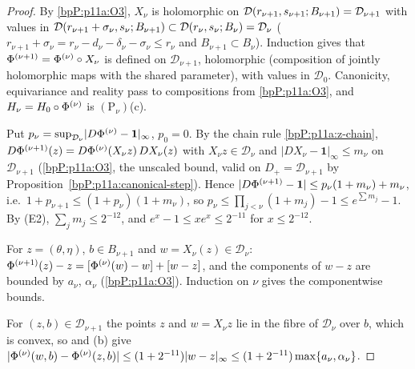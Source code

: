 \begin{proof}
\label{stepP:p11a:co-dom} By \ref{bpP:p11a:O3}, $X_\nu$ is holomorphic on $\mathcal D(r_{\nu+1},s_{\nu+1};B_{\nu+1})=\mathcal D_{\nu+1}$ with values in $\mathcal D(r_{\nu+1}+\sigma_\nu,s_\nu;B_{\nu+1})\subset\mathcal D(r_\nu,s_\nu;B_\nu)=\mathcal D_\nu$ ($r_{\nu+1}+\sigma_\nu=r_\nu-d_\nu-\delta_\nu-\sigma_\nu\le r_\nu$ and $B_{\nu+1}\subset B_\nu$). Induction gives that $\Phi^{(\nu+1)}=\Phi^{(\nu)}\circ X_\nu$ is defined on $\mathcal D_{\nu+1}$, holomorphic (composition of jointly holomorphic maps with the shared parameter), with values in $\mathcal D_0$. Canonicity, equivariance and reality pass to compositions from \ref{bpP:p11a:O3}, and $H_\nu=H_0\circ\Phi^{(\nu)}$ is $(\mathrm P_\nu)$(c).

\label{stepP:p11a:co-deriv} Put $p_\nu=\sup_{\mathcal D_\nu}\lvert D\Phi^{(\nu)}-\mathbf 1\rvert_\infty$, $p_0=0$. By the chain rule \ref{bpP:p11a:z-chain}, $D\Phi^{(\nu+1)}(z)=D\Phi^{(\nu)}(X_\nu z)\,DX_\nu(z)$ with $X_\nu z\in\mathcal D_\nu$ and $\lvert DX_\nu-\mathbf 1\rvert_\infty\le m_\nu$ on $\mathcal D_{\nu+1}$ (\ref{bpP:p11a:O3}, the unscaled bound, valid on $D_+=\mathcal D_{\nu+1}$ by Proposition~\ref{bpP:p11a:canonical-step}). Hence $\lvert D\Phi^{(\nu+1)}-\mathbf 1\rvert\le p_\nu(1+m_\nu)+m_\nu$, i.e.\ $1+p_{\nu+1}\le(1+p_\nu)(1+m_\nu)$, so $p_\nu\le\prod_{j<\nu}(1+m_j)-1\le e^{\sum m_j}-1$. By (E2), $\sum_jm_j\le2^{-12}$, and $e^{x}-1\le xe^{x}\le2^{-11}$ for $x\le2^{-12}$.

\label{stepP:p11a:co-disp} For $z=(\theta,\eta)$, $b\in B_{\nu+1}$ and $w=X_\nu(z)\in\mathcal D_\nu$: $\Phi^{(\nu+1)}(z)-z=[\Phi^{(\nu)}(w)-w]+[w-z]$, and the components of $w-z$ are bounded by $a_\nu$, $\alpha_\nu$ (\ref{bpP:p11a:O3}). Induction on $\nu$ gives the componentwise bounds.

\label{stepP:p11a:co-inc} For $(z,b)\in\mathcal D_{\nu+1}$ the points $z$ and $w=X_\nu z$ lie in the fibre of $\mathcal D_\nu$ over $b$, which is convex, so  and (b) give $\lvert\Phi^{(\nu)}(w,b)-\Phi^{(\nu)}(z,b)\rvert\le(1+2^{-11})\lvert w-z\rvert_\infty\le(1+2^{-11})\max\{a_\nu,\alpha_\nu\}$.
\end{proof}

